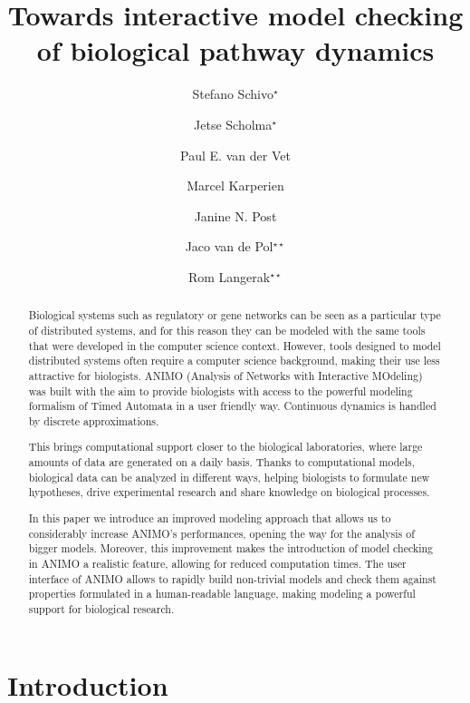 \documentclass{llncs}
\title{Towards interactive model checking\\of biological pathway dynamics}
\author{Stefano Schivo${}^\star$
\and Jetse Scholma${}^\star$
\and Paul E. van der Vet
\and Marcel Karperien
\and Janine N. Post
\and Jaco van de Pol${}^{\star \star}$
\and Rom Langerak${}^{\star \star}$}
\institute{University of Twente, Enschede, The Netherlands}
\date{}
\begin{document}
\maketitle

\let\oldthefootnote\thefootnote
\renewcommand{\thefootnote}{\fnsymbol{footnote}}
\let\thefootnote\oldthefootnote



\begin{abstract}

Biological systems such as regulatory or gene networks can be
seen as a particular type of distributed systems, and for this reason
they can be modeled with the same tools that were developed in the
computer science context. However, tools designed to model distributed
systems often require a computer science background, making their use
less attractive for biologists. ANIMO (Analysis of Networks with
Interactive MOdeling) was built with the aim to provide biologists
with access to the powerful modeling formalism of Timed Automata
in a user friendly way. Continuous dynamics is handled by discrete approximations.

This brings computational support closer to the biological laboratories, 
where large amounts of data are generated on a daily basis. Thanks to 
computational models, biological data can be analyzed in different ways, 
helping biologists to formulate new hypotheses, drive experimental research 
and share knowledge on biological processes.

In this paper we introduce an improved modeling approach that allows us
to considerably increase ANIMO's performances, opening the way for the
analysis of bigger models. Moreover, this improvement makes the introduction
of model checking in ANIMO a realistic feature, allowing for
reduced computation times. The user interface of ANIMO allows to rapidly
build non-trivial models and check them against properties formulated in
a human-readable language, making modeling a powerful
support for biological research.

\end{abstract}

\section{Introduction}\label{sec:introduction}
\end{document}
